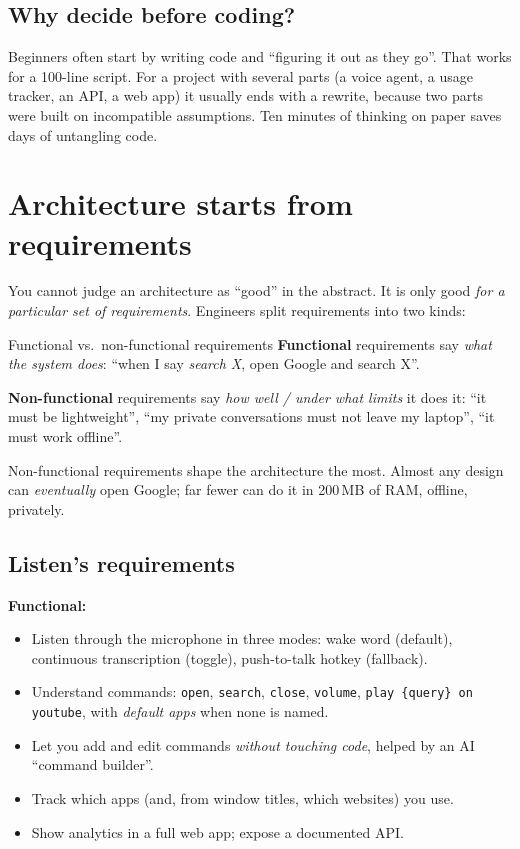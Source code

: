 \documentclass[11pt,a4paper]{article}
\begin{document}
\subsection{Why decide before coding?}
Beginners often start by writing code and ``figuring it out as they go''. That works for a
100-line script. For a project with several parts (a voice agent, a usage tracker, an API,
a web app) it usually ends with a rewrite, because two parts were built on incompatible
assumptions. Ten minutes of thinking on paper saves days of untangling code.

\section{Architecture starts from requirements}

You cannot judge an architecture as ``good'' in the abstract. It is only good \emph{for a
particular set of requirements}. Engineers split requirements into two kinds:

\begin{concept}{Functional vs.\ non-functional requirements}
\textbf{Functional} requirements say \emph{what the system does}: ``when I say
\emph{search X}, open Google and search X''.

\textbf{Non-functional} requirements say \emph{how well / under what limits} it does it:
``it must be lightweight'', ``my private conversations must not leave my laptop'', ``it
must work offline''.

Non-functional requirements shape the architecture the most. Almost any design can
\emph{eventually} open Google; far fewer can do it in 200\,MB of RAM, offline, privately.
\end{concept}

\subsection{Listen's requirements}

\noindent\textbf{Functional:}
\begin{itemize}[nosep]
  \item Listen through the microphone in three modes: wake word (default), continuous
        transcription (toggle), push-to-talk hotkey (fallback).
  \item Understand commands: \texttt{open}, \texttt{search}, \texttt{close}, \texttt{volume},
        \texttt{play \{query\} on youtube}, with \emph{default apps} when none is named.
  \item Let you add and edit commands \emph{without touching code}, helped by an AI
        ``command builder''.
  \item Track which apps (and, from window titles, which websites) you use.
  \item Show analytics in a full web app; expose a documented API.
\end{itemize}
\end{document}
